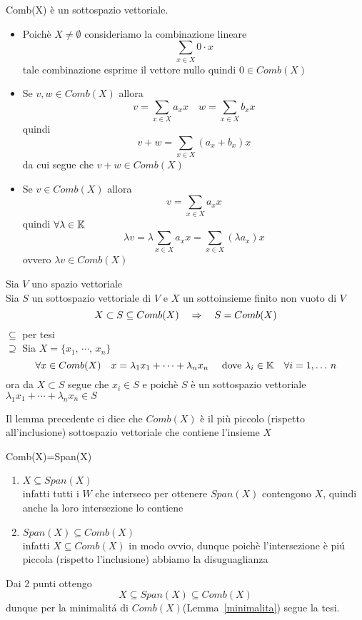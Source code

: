 \begin{thm} Comb(X) è un sottospazio vettoriale.\\
\proof \bbianco
\begin{itemize}
\item Poich\`e $X \neq \emptyset$  consideriamo la combinazione lineare
 $$\sum_{x \in X } 0 \cdot x  $$ 
 tale combinazione esprime il vettore nullo quindi $ 0 \in Comb (X)$
\item Se $v,w \in Comb(X)$ allora 
$$ v= \sum_{x \in X} a_x x \quad w=\sum_{x \in X } b_x x $$ quindi 
$$
 v+w=\sum_{x \in X} (a_x+b_x)x $$ da cui segue che $ v+w \in Comb(X)$
\item Se $ v \in Comb(X) $ allora 
$$  v= \sum_{x \in X} a_x x $$ quindi 
$\forall \lambda \in \mathbb{K} $ $$ \lambda v = \lambda \sum_{x \in X }a_x x = \sum_{x \in X} (\lambda a_x) x $$ ovvero $\lambda v \in Comb(X)$
\end{itemize}

\endproof
\end{thm}

\begin{lem}\label{minimalita} \bianco
Sia $V$ uno spazio vettoriale \\
Sia $S$ un sottospazio vettoriale di $V$   e $X$ un sottoinsieme finito non vuoto di $V$
$$X\subset S \subseteq Comb(X) \quad \Rightarrow  \quad S =Comb(X)$$
\proof  \bianco$ \subseteq $ per tesi  \\
$\supseteq$ Sia $X=\{ x_1, \, \cdots , \, x_n \}$
$$\forall x \in Comb(X)  \quad  x=\lambda_1 x_1 + \cdots + \lambda_n x_n  \quad \text{ dove   } \lambda_i  \in \mathbb{K}  \quad \forall i =1, \dots \, n $$
 ora da $ X \subset S $ segue che $x_i \in S $ e poich\`e $S$ \`e un sottospazio vettoriale $\lambda_1 x_1 + \cdots + \lambda_n x_n \in S $
\endproof
\begin{oss}Il lemma precedente ci dice che $Comb(X)$ \`e il pi\`u piccolo (rispetto all'inclusione) sottospazio vettoriale che contiene l'insieme $X$
\end{oss}
\end{lem}
\spazio

\begin{thm} Comb(X)=Span(X)
\proof  \bbianco
\begin{enumerate}
\item $ X\subseteq Span (X) $\\
 infatti tutti i $W $ che interseco per ottenere $Span(X) $ contengono $X$, quindi anche la loro intersezione lo contiene
\item $Span(X)\subseteq Comb (X) $ \\
infatti  $X\subseteq Comb(X) $ in modo ovvio, dunque poich\`e l'intersezione \`e pi\'u piccola (rispetto l'inclusione) abbiamo la disuguaglianza
\end{enumerate}
Dai 2 punti ottengo $$ X \subseteq Span(X) \subseteq Comb(X) $$ 
dunque per la minimalit\'a di $Comb(X)$(Lemma~\ref{minimalita}) segue la tesi.
\end{thm}
\newpage
